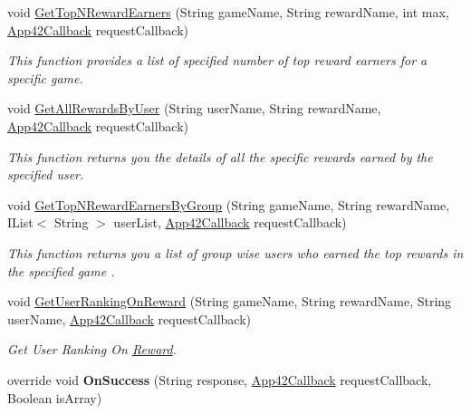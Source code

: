 \begin{DoxyCompactItemize}
void \hyperlink{classcom_1_1shephertz_1_1app42_1_1paas_1_1sdk_1_1windows_1_1reward_1_1_reward_service_a4a2e706182458157090597b4fc1edb73}{Get\+Top\+N\+Reward\+Earners} (String game\+Name, String reward\+Name, int max, \hyperlink{interfacecom_1_1shephertz_1_1app42_1_1paas_1_1sdk_1_1windows_1_1_app42_callback}{App42\+Callback} request\+Callback)
\begin{DoxyCompactList}\small\item\em This function provides a list of specified number of top reward earners for a specific game. \end{DoxyCompactList}\item 
void \hyperlink{classcom_1_1shephertz_1_1app42_1_1paas_1_1sdk_1_1windows_1_1reward_1_1_reward_service_af519a4c7d6dc95b9acc35d37f39e6d28}{Get\+All\+Rewards\+By\+User} (String user\+Name, String reward\+Name, \hyperlink{interfacecom_1_1shephertz_1_1app42_1_1paas_1_1sdk_1_1windows_1_1_app42_callback}{App42\+Callback} request\+Callback)
\begin{DoxyCompactList}\small\item\em This function returns you the details of all the specific rewards earned by the specified user. \end{DoxyCompactList}\item 
void \hyperlink{classcom_1_1shephertz_1_1app42_1_1paas_1_1sdk_1_1windows_1_1reward_1_1_reward_service_a5625115a1469b8caf2c479eb2f56eb2d}{Get\+Top\+N\+Reward\+Earners\+By\+Group} (String game\+Name, String reward\+Name, I\+List$<$ String $>$ user\+List, \hyperlink{interfacecom_1_1shephertz_1_1app42_1_1paas_1_1sdk_1_1windows_1_1_app42_callback}{App42\+Callback} request\+Callback)
\begin{DoxyCompactList}\small\item\em This function returns you a list of group wise users who earned the top rewards in the specified game . \end{DoxyCompactList}\item 
void \hyperlink{classcom_1_1shephertz_1_1app42_1_1paas_1_1sdk_1_1windows_1_1reward_1_1_reward_service_a5907bb03a2dcf80e045f118447c2d2e3}{Get\+User\+Ranking\+On\+Reward} (String game\+Name, String reward\+Name, String user\+Name, \hyperlink{interfacecom_1_1shephertz_1_1app42_1_1paas_1_1sdk_1_1windows_1_1_app42_callback}{App42\+Callback} request\+Callback)
\begin{DoxyCompactList}\small\item\em Get User Ranking On \hyperlink{classcom_1_1shephertz_1_1app42_1_1paas_1_1sdk_1_1windows_1_1reward_1_1_reward}{Reward}. \end{DoxyCompactList}\item 
\hypertarget{classcom_1_1shephertz_1_1app42_1_1paas_1_1sdk_1_1windows_1_1reward_1_1_reward_service_adbd3aa6400c630385c4f398aae0dadf8}{override void {\bfseries On\+Success} (String response, \hyperlink{interfacecom_1_1shephertz_1_1app42_1_1paas_1_1sdk_1_1windows_1_1_app42_callback}{App42\+Callback} request\+Callback, Boolean is\+Array)}\label{classcom_1_1shephertz_1_1app42_1_1paas_1_1sdk_1_1windows_1_1reward_1_1_reward_service_adbd3aa6400c630385c4f398aae0dadf8}


\end{DoxyCompactItemize}

